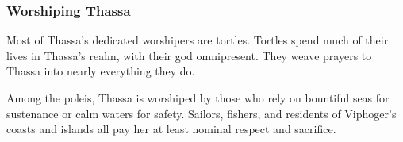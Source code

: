     \subsubsection{Worshiping Thassa}
        Most of Thassa's dedicated worshipers are tortles.%
        Tortles spend much of their lives in Thassa's realm, with their god omnipresent.
        They weave prayers to Thassa into nearly everything they do.

        Among the poleis, Thassa is worshiped by those who rely on bountiful seas for sustenance or calm waters for safety.
        Sailors, fishers, and residents of Viphoger's coasts and islands all pay her at least nominal respect and sacrifice.



\newpage
